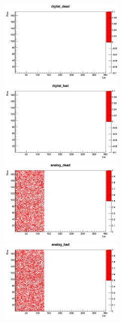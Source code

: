 \begin{figure}[bpt]\centering
  \begin{minipage}{0.45\hsize}
    \includegraphics[width=6.0cm]{./data/analysis_result/digital_dead.png}
  \end{minipage}
  \begin{minipage}{0.45\hsize}
    \includegraphics[width=6.0cm]{./data/analysis_result/digital_bad.png}
  \end{minipage}
  \begin{minipage}{0.45\hsize}
    \includegraphics[width=6.0cm]{./data/analysis_result/analog_dead.png}
  \end{minipage}
  \begin{minipage}{0.45\hsize}
    \includegraphics[width=6.0cm]{./data/analysis_result/analog_bad.png}
  \end{minipage}
  \begin{minipage}{0.45\hsize}

\end{minipage}
\end{figure}
